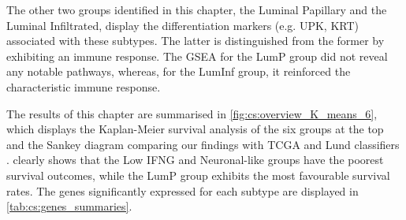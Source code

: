 The other two groups identified in this chapter, the Luminal Papillary and the Luminal Infiltrated, display the differentiation markers (e.g. UPK, KRT) associated with these subtypes. The latter is distinguished from the former by exhibiting an immune response. The GSEA for the LumP group did not reveal any notable pathways, whereas, for the LumInf group, it reinforced the characteristic immune response.


The results of this chapter are summarised in \cref{fig:cs:overview_K_means_6}, which displays the Kaplan-Meier survival analysis of the six groups at the top and the Sankey diagram comparing our findings with TCGA and Lund classifiers \citep{Robertson2017-mg,Marzouka2018-ge}.  clearly shows that the Low IFNG and Neuronal-like groups have the poorest survival outcomes, while the LumP group exhibits the most favourable survival rates. The genes significantly expressed for each subtype are displayed in \cref{tab:cs:genes_summaries}.
 

